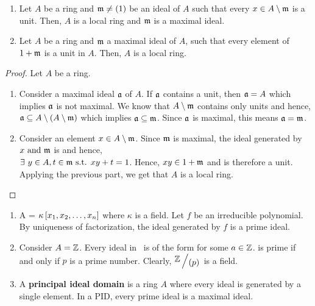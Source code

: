 \begin{proposition}{}{}
	\begin{enumerate}
		\item Let \( A \) be a ring and \( \mathfrak{m} \neq \left( 1 \right) \) be an
		ideal of \( A \) such that every \( x \in A \setminus \mathfrak{m} \)
		is a unit.
		Then, \( A \) is a local ring and \( \mathfrak{m} \) is a maximal ideal.
		\item Let \( A \) be a ring and \( \mathfrak{m} \) a maximal ideal of
		\( A \), such that every element of \( 1 + \mathfrak{m} \) is a unit
		in \( A \).
		Then, \( A \) is a local ring.
	\end{enumerate}
\end{proposition}
\begin{proof}
	Let \( A \) be a ring.
	\begin{enumerate}
		\item Consider a maximal ideal \( \mathfrak{a} \) of \( A \).
		If \( \mathfrak{a} \) contains a unit, then \( \mathfrak{a} = A \) which
		implies \( \mathfrak{a} \) is not maximal.
		We know that \( A \setminus \mathfrak{m} \) contains only units and hence,
		\( \mathfrak{a} \subseteq A \setminus \left( A \setminus \mathfrak{m} \right) \)
		which implies \( \mathfrak{a} \subseteq \mathfrak{m} \).
		Since \( \mathfrak{a} \) is maximal, this means \( \mathfrak{a} = \mathfrak{m} \).

		\item Consider an element \( x \in A \setminus \mathfrak{m} \).
		Since \( \mathfrak{m} \) is maximal, the ideal generated by
		\( x \text{ and } \mathfrak{m} \) is  and hence, \\
		\( \exists\ y \in A, t \in \mathfrak{m} \text{ s.t. } xy + t = 1 \).
		Hence, \( xy \in 1 + \mathfrak{m} \) and is therefore a unit.
		Applying the previous part, we get that \( A \) is a local ring.
	\end{enumerate}
\end{proof}


\begin{example}{}{}
	\begin{enumerate}
		\item A = \( \kappa\left[ x_1, x_2, \ldots, x_n \right] \) where
		\( \kappa \) is a field.
		Let \( f \) be an irreducible polynomial.
		By uniqueness of factorization, the ideal generated by
		\( f \) is a prime ideal.

		\item Consider \( A = \ZZ \).
		Every ideal in \ZZ\ is of the form  for some \( a \in \ZZ \).
		 is prime if and only if \( p \) is a prime number.
		Clearly, \( \bigslant{\ZZ}{\brak{p}} \) is a field.

		\item A \textbf{principal ideal domain} is a ring \( A \) where
		every ideal is generated by a single element.
		In a PID, every prime ideal is a maximal ideal.
	\end{enumerate}
\end{example}


